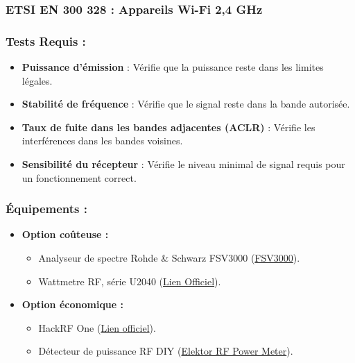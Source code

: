 \documentclass[a4paper,12pt]{article}
\begin{document}
\subsubsection{ETSI EN 300 328 : Appareils Wi-Fi 2,4 GHz}
\subsubsection*{Tests Requis :}
\begin{itemize}
    \item \textbf{Puissance d’émission} : Vérifie que la puissance reste dans les limites légales.
    \item \textbf{Stabilité de fréquence} : Vérifie que le signal reste dans la bande autorisée.
    \item \textbf{Taux de fuite dans les bandes adjacentes (ACLR)} : Vérifie les interférences dans les bandes voisines.
    \item \textbf{Sensibilité du récepteur} : Vérifie le niveau minimal de signal requis pour un fonctionnement correct.
\end{itemize}

\subsubsection*{Équipements :}
\begin{itemize}
    \item \textbf{Option coûteuse :}
          \begin{itemize}
              \item Analyseur de spectre Rohde \& Schwarz FSV3000 (\href{https://www.rohde-schwarz.com/product/FSV3000.html}{FSV3000}).
              \item Wattmetre RF, série U2040 (\href{https://www.keysight.com/us/en/assets/7018-04521/data-sheets/5992-0040.pdf}{Lien Officiel}).
          \end{itemize}
    \item \textbf{Option économique :}
          \begin{itemize}
              \item HackRF One (\href{https://greatscottgadgets.com/hackrf/one/}{Lien officiel}).
              \item Détecteur de puissance RF DIY (\href{https://www.motorobit.com/usb-rf-power-meter-v30-100k-10ghz-rf-power-meter-with-display}{Elektor RF Power Meter}).
          \end{itemize}
\end{itemize}
\end{document}
